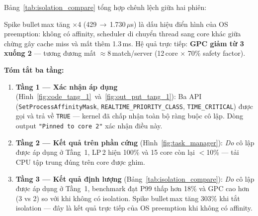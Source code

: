 \documentclass[12pt,a4paper]{report}
\begin{document}
Bảng~\ref{tab:isolation_compare} tổng hợp chênh lệch giữa hai phiên:

\begin{table}[H]
\centering
\caption{So sánh định lượng: có isolation vs.\ không isolation ---
         cùng 10\,player, 590\,đạn, 6.000\,tick}
\label{tab:isolation_compare}
\end{table}

\noindent Spike bullet\,max tăng $\times$4 (429\,$\to$\,1.730\,$\mu$s) là dấu
hiệu điển hình của OS preemption: không có affinity, scheduler di chuyển thread
sang core khác giữa chừng gây cache miss và mất thêm 1.3\,ms.
Hệ quả trực tiếp: \textbf{GPC giảm từ 3 xuống 2} --- tương đương mất
$\approx$8\,match/server (12\,core $\times$ 70\% safety factor).

\medskip
\noindent\textbf{Tóm tắt ba tầng:}

\begin{enumerate}
  \item \textbf{Tầng 1 --- Xác nhận áp dụng}
        (Hình~\ref{fig:code_tang_1}~và~\ref{fig:out_put_tang_1}):
        Ba API (\texttt{SetProcessAffinityMask}, \texttt{REALTIME\_PRIORITY\_CLASS},
        \texttt{TIME\_CRITICAL}) được gọi và trả về \texttt{TRUE} ---
        kernel đã chấp nhận toàn bộ ràng buộc cô lập.
        Dòng output \texttt{"Pinned to core 2"} xác nhận điều này.

  \item \textbf{Tầng 2 --- Kết quả trên phần cứng}
        (Hình~\ref{fig:task_manager}):
        \emph{Do} cô lập được áp dụng ở Tầng~1, LP\,2 hiện 100\% và
        15 core còn lại $<$10\% --- tải CPU tập trung đúng trên core được ghim.

  \item \textbf{Tầng 3 --- Kết quả định lượng}
        (Bảng~\ref{tab:isolation_compare}):
        \emph{Do} cô lập được áp dụng ở Tầng~1, benchmark đạt P99 thấp hơn
        18\% và GPC cao hơn (3 vs 2) so với khi không có isolation.
        Spike bullet\,max tăng 303\% khi tắt isolation --- đây là kết quả
        trực tiếp của OS preemption khi không có affinity.
\end{enumerate}
\end{document}
